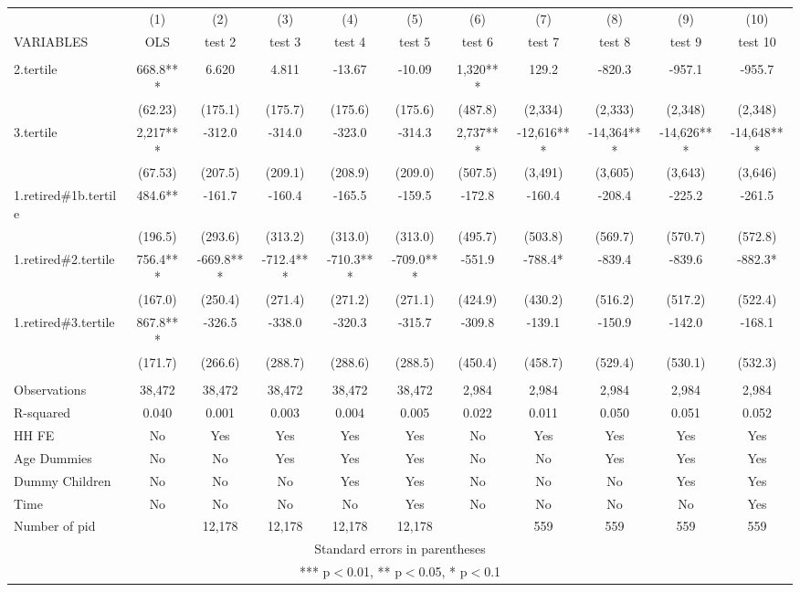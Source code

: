 \begin{tabular}{lcccccccccc} \hline
 & (1) & (2) & (3) & (4) & (5) & (6) & (7) & (8) & (9) & (10) \\
VARIABLES & OLS & test 2 & test 3 & test 4 & test 5 & test 6 & test 7 & test 8 & test 9 & test 10 \\ \hline
 &  &  &  &  &  &  &  &  &  &  \\
2.tertile & 668.8*** & 6.620 & 4.811 & -13.67 & -10.09 & 1,320*** & 129.2 & -820.3 & -957.1 & -955.7 \\
 & (62.23) & (175.1) & (175.7) & (175.6) & (175.6) & (487.8) & (2,334) & (2,333) & (2,348) & (2,348) \\
3.tertile & 2,217*** & -312.0 & -314.0 & -323.0 & -314.3 & 2,737*** & -12,616*** & -14,364*** & -14,626*** & -14,648*** \\
 & (67.53) & (207.5) & (209.1) & (208.9) & (209.0) & (507.5) & (3,491) & (3,605) & (3,643) & (3,646) \\
1.retired\#1b.tertile & 484.6** & -161.7 & -160.4 & -165.5 & -159.5 & -172.8 & -160.4 & -208.4 & -225.2 & -261.5 \\
 & (196.5) & (293.6) & (313.2) & (313.0) & (313.0) & (495.7) & (503.8) & (569.7) & (570.7) & (572.8) \\
1.retired\#2.tertile & 756.4*** & -669.8*** & -712.4*** & -710.3*** & -709.0*** & -551.9 & -788.4* & -839.4 & -839.6 & -882.3* \\
 & (167.0) & (250.4) & (271.4) & (271.2) & (271.1) & (424.9) & (430.2) & (516.2) & (517.2) & (522.4) \\
1.retired\#3.tertile & 867.8*** & -326.5 & -338.0 & -320.3 & -315.7 & -309.8 & -139.1 & -150.9 & -142.0 & -168.1 \\
 & (171.7) & (266.6) & (288.7) & (288.6) & (288.5) & (450.4) & (458.7) & (529.4) & (530.1) & (532.3) \\
 &  &  &  &  &  &  &  &  &  &  \\
Observations & 38,472 & 38,472 & 38,472 & 38,472 & 38,472 & 2,984 & 2,984 & 2,984 & 2,984 & 2,984 \\
R-squared & 0.040 & 0.001 & 0.003 & 0.004 & 0.005 & 0.022 & 0.011 & 0.050 & 0.051 & 0.052 \\
HH FE & No & Yes & Yes & Yes & Yes & No & Yes & Yes & Yes & Yes \\
Age Dummies & No & No & Yes & Yes & Yes & No & No & Yes & Yes & Yes \\
Dummy Children & No & No & No & Yes & Yes & No & No & No & Yes & Yes \\
Time & No & No & No & No & Yes & No & No & No & No & Yes \\
 Number of pid &  & 12,178 & 12,178 & 12,178 & 12,178 &  & 559 & 559 & 559 & 559 \\ \hline
\multicolumn{11}{c}{ Standard errors in parentheses} \\
\multicolumn{11}{c}{ *** p$<$0.01, ** p$<$0.05, * p$<$0.1} \\
\end{tabular}
